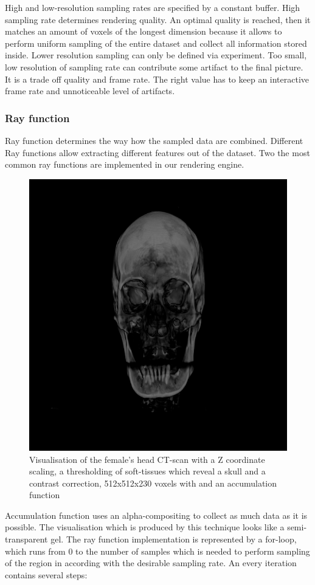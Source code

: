 \documentclass[twoside, english, 11pt]{report}
\begin{document}
High and low-resolution sampling rates are specified by a constant buffer. High sampling rate determines rendering quality. An optimal quality is reached, then it matches an amount of voxels of the longest dimension because it allows to perform uniform sampling of the entire dataset and collect all information stored inside. Lower resolution sampling can only be defined via experiment. Too small, low resolution of sampling rate can contribute some artifact to the final picture. It is a trade off quality and frame rate. The right value has to keep an interactive frame rate and unnoticeable level of artifacts.


\subsubsection{Ray function}
Ray function determines the way how the sampled data are combined. Different Ray functions allow extracting different features out of the dataset. Two the most common ray functions are implemented in our rendering engine.\\
\begin{figure}[H]
\centerline{\includegraphics[scale = 0.6]{img/head-th-win}}
\caption{Visualisation of the female's head CT-scan with a Z coordinate scaling, a thresholding of soft-tissues which reveal a skull and a contrast correction, 512x512x230 voxels with and an accumulation function \label{fig:head-th-win}}
\end{figure}
Accumulation function uses an alpha-compositing to collect as much data as it is possible. The visualisation which is produced by this technique looks like a semi-transparent gel. The ray function implementation is represented by a for-loop, which runs from 0 to the number of samples which is needed to perform sampling of the region in according with the desirable sampling rate. An every iteration contains several steps:
\end{document}
